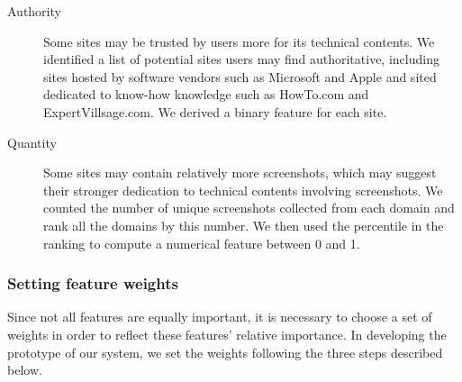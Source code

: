 \documentclass{www2010-submission}
\begin{document}
\begin{description}

\item[Authority] Some sites may be trusted by users more for its
  technical contents. We identified a list of potential sites users
  may find authoritative, including sites hosted by software vendors
  such as Microsoft and Apple and sited dedicated to know-how
  knowledge such as HowTo.com and ExpertVillsage.com. We derived a
  binary feature for each site.

\item[Quantity] Some sites may contain relatively more screenshots,
  which may suggest their stronger dedication to technical contents
  involving screenshots.  We counted the number of unique screenshots
  collected from each domain and rank all the domains by this
  number. We then used the percentile in the ranking to compute a
  numerical feature between 0 and 1.



\end{description}

\subsubsection{Setting feature weights}

Since not all features are equally important, it is necessary to
choose a set of weights in order to reflect these features' relative
importance. In developing the prototype of our system, we set the
weights following the three steps described below.
\end{document}
